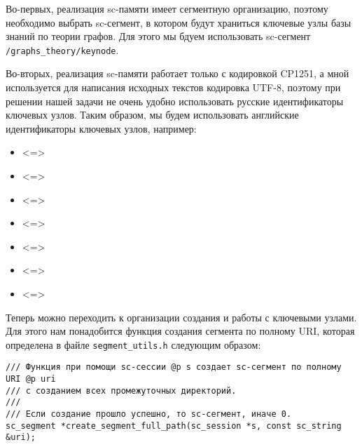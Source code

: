 Во-первых, реализация sc-памяти имеет сегментную организацию, поэтому
необходимо выбрать sc-сегмент, в котором будут храниться ключевые узлы
базы знаний по теории графов. Для этого мы бдуем использовать sc-сегмент
\verb|/graphs_theory/keynode|.

Во-вторых, реализация sc-памяти работает только с кодировкой CP1251, а
мной используется для написания исходных текстов кодировка UTF-8,
поэтому при решении нашей задачи не очень удобно использовать русские
идентификаторы ключевых узлов. Таким образом, мы будем использовать
английские идентификаторы ключевых узлов, например:
\begin{itemize}
\item {} <=> 
\item {} <=> 
\item {} <=> 
\item {} <=> 
\item {} <=> 
\item {} <=> 
\item {} <=> 
\end{itemize}

Теперь можно переходить к организации создания и работы с ключевыми
узлами. Для этого нам понадобится функция создания сегмента по полному
URI, которая определена в файле \verb|segment_utils.h| следующим
образом:
\begin{lstlisting}[texcl]
/// Функция при помощи sc-сессии @p s создает sc-сегмент по полному URI @p uri
/// c созданием всех промежуточных директорий.
///
/// Если создание прошло успешно, то sc-сегмент, иначе 0.
sc_segment *create_segment_full_path(sc_session *s, const sc_string &uri);
\end{lstlisting}

